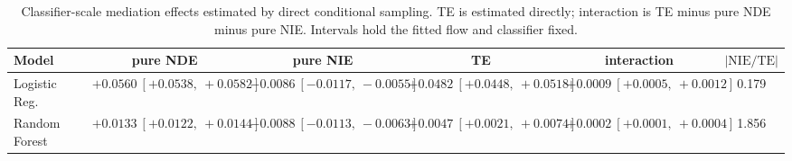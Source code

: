 \begin{table}[htbp]
  \centering
  \caption{Classifier-scale mediation effects estimated by direct conditional sampling. TE is estimated directly; interaction is TE minus pure NDE minus pure NIE. Intervals hold the fitted flow and classifier fixed.}
  \label{tab:german_gap_overall}
  \begin{tabular}{lccccc}
    \toprule
    Model & pure NDE & pure NIE & TE & interaction & $|\mathrm{NIE}/\mathrm{TE}|$ \\
    \midrule
    Logistic Reg. & $+0.0560\ [+0.0538,\ +0.0582]$ & $-0.0086\ [-0.0117,\ -0.0055]$ & $+0.0482\ [+0.0448,\ +0.0518]$ & $+0.0009\ [+0.0005,\ +0.0012]$ & 0.179 \\
    Random Forest & $+0.0133\ [+0.0122,\ +0.0144]$ & $-0.0088\ [-0.0113,\ -0.0063]$ & $+0.0047\ [+0.0021,\ +0.0074]$ & $+0.0002\ [+0.0001,\ +0.0004]$ & 1.856 \\
    \bottomrule
  \end{tabular}
\end{table}
